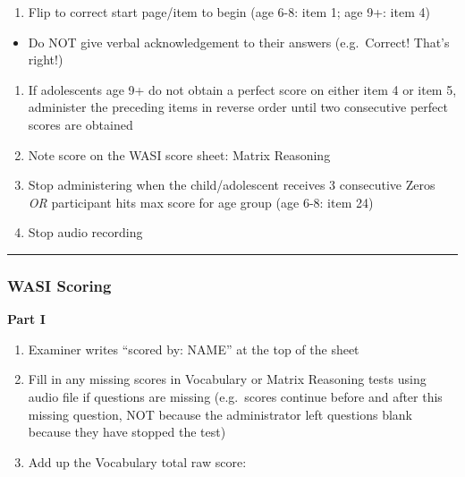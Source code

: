 \documentclass[]{book}
\providecommand{\tightlist}{%
  \setlength{\itemsep}{0pt}\setlength{\parskip}{0pt}}
\begin{document}
\begin{enumerate}
\def\labelenumi{\arabic{enumi}.}
\setcounter{enumi}{1}
\tightlist
\item
  Flip to correct start page/item to begin (age 6-8: item 1; age 9+:
  item 4)
\end{enumerate}

\begin{itemize}
\tightlist
\item
  Do NOT give verbal acknowledgement to their answers (e.g.~Correct!
  That's right!)
\end{itemize}

\begin{enumerate}
\def\labelenumi{\arabic{enumi}.}
\setcounter{enumi}{2}
\tightlist
\item
  If adolescents age 9+ do not obtain a perfect score on either item 4
  or item 5, administer the preceding items in reverse order until two
  consecutive perfect scores are obtained
\item
  Note score on the WASI score sheet: Matrix Reasoning
\item
  Stop administering when the child/adolescent receives 3 consecutive
  Zeros \emph{OR} participant hits max score for age group (age 6-8:
  item 24)
\item
  Stop audio recording
\end{enumerate}

\begin{center}\rule{0.5\linewidth}{0.5pt}\end{center}

\subsubsection{WASI Scoring}\label{wasi-scoring}

\textbf{Part I}

\begin{enumerate}
\def\labelenumi{\arabic{enumi}.}
\tightlist
\item
  Examiner writes ``scored by: NAME'' at the top of the sheet
\item
  Fill in any missing scores in Vocabulary or Matrix Reasoning tests
  using audio file if questions are missing (e.g.~scores continue before
  and after this missing question, NOT because the administrator left
  questions blank because they have stopped the test)
\item
  Add up the Vocabulary total raw score:
\end{enumerate}
\end{document}
